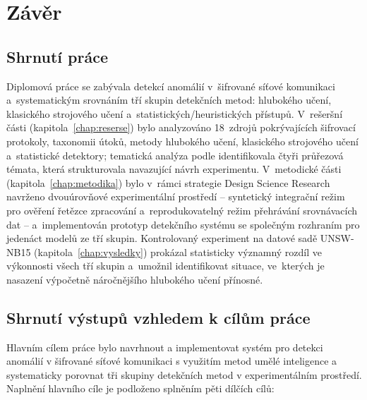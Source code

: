 \chapter*{Závěr}

\section*{Shrnutí práce}

Diplomová práce se zabývala detekcí anomálií v~šifrované síťové komunikaci a~systematickým srovnáním tří skupin detekčních metod: hlubokého učení, klasického strojového učení a~statistických/heuristických přístupů. V~rešeršní části (kapitola~\ref{chap:reserse}) bylo analyzováno 18~zdrojů pokrývajících šifrovací protokoly, taxonomii útoků, metody hlubokého učení, klasického strojového učení a~statistické detektory; tematická analýza podle \textcite{Braun2006} identifikovala čtyři průřezová témata, která strukturovala navazující návrh experimentu. V~metodické části (kapitola~\ref{chap:metodika}) bylo v~rámci strategie Design Science Research \parencite{Peffers2007} navrženo dvouúrovňové experimentální prostředí -- syntetický integrační režim pro ověření řetězce zpracování a~reprodukovatelný režim přehrávání srovnávacích dat -- a~implementován prototyp detekčního systému se společným rozhraním pro jedenáct modelů ze tří skupin. Kontrolovaný experiment na datové sadě UNSW-NB15 (kapitola~\ref{chap:vysledky}) prokázal statisticky významný rozdíl ve výkonnosti všech tří skupin a~umožnil identifikovat situace, ve~kterých je nasazení výpočetně náročnějšího hlubokého učení přínosné.

\section*{Shrnutí výstupů vzhledem k cílům práce}

Hlavním cílem práce bylo navrhnout a implementovat systém pro detekci anomálií
v šifrované síťové komunikaci s využitím metod umělé inteligence a systematicky porovnat tři
skupiny detekčních metod v experimentálním prostředí. Naplnění hlavního cíle je podloženo splněním pěti dílčích cílů:

